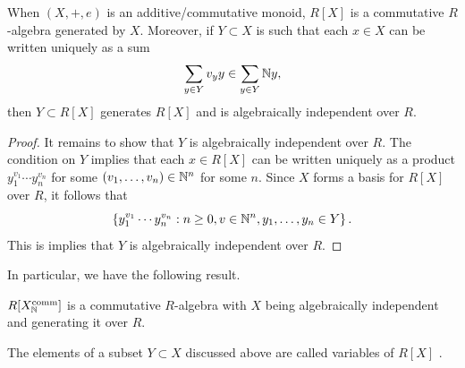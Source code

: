 \begin{proposition}
    When $(X,+,e)$ is an additive/commutative monoid, $R[X]$ is a commutative $R$-algebra generated by $X$. Moreover, if $Y\subset X$ is such that each $x\in X$ can be written uniquely as a sum 
    $$
        \sum_{y\in Y} v_y y \in \sum_{y\in Y} \mathbb{N} y, 
    $$   
    then $Y\subset R[X]$ generates $R[X]$ and is algebraically independent over $R$.
\end{proposition}
\begin{proof}
    It remains to show that $Y$ is algebraically independent over $R$. The condition on $Y$ implies that each $x\in R[X]$ can be written uniquely as a product $y_1^{v_1}\cdots y_n^{v_n}$ for some $(v_1,\dots,v_n)\in \mathbb{N}^n$ for some $n$. Since $X$ forms a basis for $R[X]$ over $R$, it follows that 
    $$
        \left\{y_1^{v_1}\cdots y_n^{v_n} : n\geq 0, v\in \mathbb{N}^n, y_1,\dots,y_n \in Y \right\}.
    $$
    This is implies that $Y$ is algebraically independent over $R$. 
\end{proof}
In particular, we have the following result.
\begin{corollary}
    $R[X_{\mathbb{N}}^\mathrm{comm}]$ is a commutative $R$-algebra with $X$ being algebraically independent and generating it over $R$. 
\end{corollary}
\begin{remark}
    The elements of a subset $Y\subset X$ discussed above are called variables of $R[X]$ .
\end{remark}
